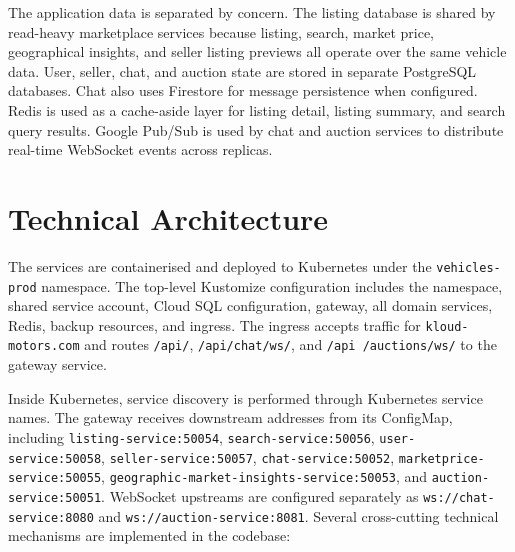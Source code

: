 The application data is separated by concern. The listing database is shared by read-heavy marketplace services because listing, search, market price, geographical insights, and seller listing previews all operate over the same vehicle data. User, seller, chat, and auction state are stored in separate PostgreSQL databases. Chat also uses Firestore for message persistence when configured. Redis is used as a cache-aside layer for listing detail, listing summary, and search query results. Google Pub/Sub is used by chat and auction services to distribute real-time WebSocket events across replicas.

\section{Technical Architecture}

The services are containerised and deployed to Kubernetes under the \texttt{vehicles-prod} namespace. The top-level Kustomize configuration includes the namespace, shared service account, Cloud SQL configuration, gateway, all domain services, Redis, backup resources, and ingress. The ingress accepts traffic for \texttt{kloud-motors.com} and routes \texttt{/api/}, \texttt{/api/chat/ws/}, and \texttt{/api
/auctions/ws/} to the gateway service.

Inside Kubernetes, service discovery is performed through Kubernetes service names. The gateway receives downstream addresses from its ConfigMap, including \texttt{listing-service:50054}, \texttt{search-service:50056}, \texttt{user-service:50058}, \texttt{seller-service:50057}, \texttt{chat-service:50052}, \texttt{marketprice-service:50055}, \texttt{geographic-market-insights-service:50053}, and \texttt{auction-
service:50051}. WebSocket upstreams are configured separately as \texttt{ws://chat-service:8080} and \texttt{ws://auction-service:8081}. Several cross-cutting technical mechanisms are implemented in the codebase:

